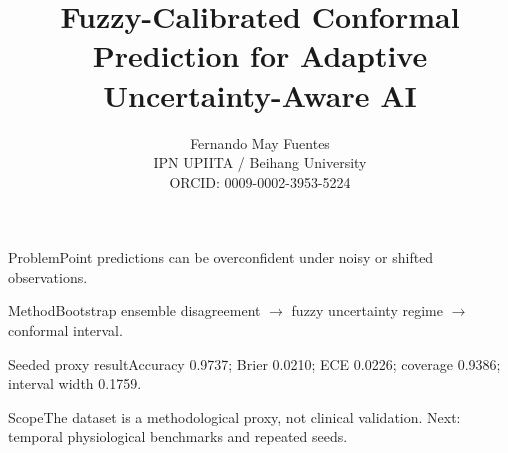 \documentclass{beamer}
\title{Fuzzy-Calibrated Conformal Prediction for Adaptive Uncertainty-Aware AI}
\author{Fernando May Fuentes\\IPN UPIITA / Beihang University\\ORCID: 0009-0002-3953-5224}
\institute{ISCMI 2026}
\begin{document}
\frame{\titlepage}
\begin{frame}{Problem}Point predictions can be overconfident under noisy or shifted observations.\end{frame}
\begin{frame}{Method}Bootstrap ensemble disagreement $\rightarrow$ fuzzy uncertainty regime $\rightarrow$ conformal interval.\end{frame}
\begin{frame}{Seeded proxy result}Accuracy 0.9737; Brier 0.0210; ECE 0.0226; coverage 0.9386; interval width 0.1759.\end{frame}
\begin{frame}{Scope}The dataset is a methodological proxy, not clinical validation. Next: temporal physiological benchmarks and repeated seeds.\end{frame}
\end{document}
